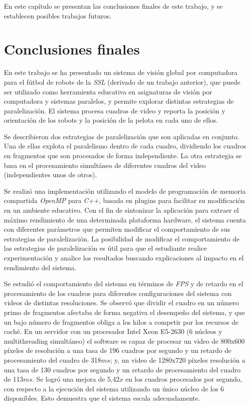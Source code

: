
En este capítulo se presentan las conclusiones finales de este trabajo, y se
establecen posibles trabajos futuros.

\section{Conclusiones finales}

\label{concluciones}

En este trabajo se ha presentado un sistema de visión global por
computadora para el fútbol de robots de la \emph{SSL} (derivado de un trabajo
anterior), que puede ser utilizado como herramienta educativa en asignaturas de
visión por computadora y sistemas paralelos, y permite explorar distintas
estrategias de paralelización. El sistema procesa cuadros de video y reporta la
posición y orientación de los robots y la posición de la pelota en cada uno de
ellos.

Se describieron dos estrategias de paralelización que son aplicadas en conjunto.
Una de ellas explota el paralelismo dentro de cada cuadro, dividiendo los
cuadros en fragmentos que son procesados de forma independiente. La otra
estrategia se basa en el procesamiento simultáneo de diferentes cuadros del
video (independientes unos de otros).

Se realizó una implementación utilizando el modelo de programación de memoria
compartida \emph{OpenMP} para \emph{C++}, basada en plugins para facilitar su
modificación en un ambiente educativo. Con el fin de sintonizar la aplicación
para extraer el máximo rendimiento de una determinada plataforma hardware, el
sistema cuenta con diferentes parámetros que permiten modificar el
comportamiento de sus estrategias de paralelización. La posibilidad de modificar
el comportamiento de las estrategias de paralelización es útil para que el
estudiante realice experimentación y analice los resultados buscando
explicaciones al impacto en el rendimiento del sistema.

Se estudió el comportamiento del sistema en términos de \emph{FPS} y de retardo
en el procesamiento de los cuadros para diferentes configuraciones del sistema
con videos de distintas resoluciones. Se observó que dividir el cuadro
en un número primo de fragmentos afectaba de forma negativa el desempeño del
sistema, y que un bajo número de fragmentos obliga a los hilos a competir por
los recursos de caché. En un servidor con un procesador Intel Xeon E5-2630 (6
núcleos y multithreading simultáneo) el software es capaz de procesar un video
de 800x600 píxeles de resolución a una tasa de 196 cuadros por segundo y un
retardo de procesamiento del cuadro de 318$ms$; y, un video de 1280x720 píxeles
resolución a una tasa de 130 cuadros por segundo y un retardo de procesamiento
del cuadro de 113$ms$. Se logró una mejora de 5,42$x$ en los cuadros procesados
por segundo, con respecto a la ejecución del sistema utilizando un único núcleo
de los 6 disponibles. Esto demuestra que el sistema escala adecuadamente.

